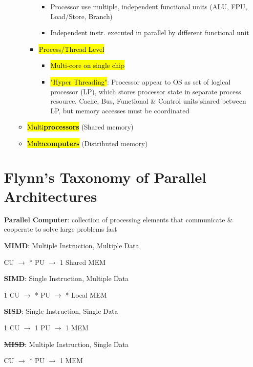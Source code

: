 \documentclass[12pt]{article}
\begin{document}
\begin{spacing}{1.5}
\begin{itemize}
\begin{itemize}
\begin{itemize}
\begin{itemize}
							\item Processor use multiple, independent functional units (ALU, FPU, Load/Store, Branch)
							\item Independent instr. executed in parallel by different functional unit
						\end{itemize}
					\item \hl{Process/Thread Level}
						\begin{itemize}
							\item \hl{Multi-core on single chip}
							\item \hl{"Hyper Threading"}: Processor appear to OS as set of logical processor (LP), which stores processor state in separate process resource. Cache, Bus, Functional \& Control units shared between LP, but memory accesses must be coordinated
						\end{itemize}
				\end{itemize}
			\item \hl{Multi\textbf{processors}} (Shared memory)
			\item \hl{Multi\textbf{computers}} (Distributed memory)
		\end{itemize}
\end{itemize}

\section{Flynn's Taxonomy of Parallel Architectures}

\begin{itemize*}
	\item \textbf{Parallel Computer}: collection of processing elements that communicate \& cooperate to solve large problems fast
	\item \textbf{MIMD}: Multiple Instruction, Multiple Data
		\begin{itemize*}
			\item * CU $\rightarrow$ * PU $\rightarrow$ 1 Shared MEM
		\end{itemize*}
	\item \textbf{SIMD}: Single Instruction, Multiple Data
		\begin{itemize*}
			\item 1 CU $\rightarrow$ * PU $\rightarrow$ * Local MEM
		\end{itemize*}
	\item \st{\textbf{SISD}}: Single Instruction, Single Data 
		\begin{itemize*}
			\item 1 CU $\rightarrow$ 1 PU $\rightarrow$ 1 MEM
		\end{itemize*}
	\item \st{\textbf{MISD}}: Multiple Instruction, Single Data
		\begin{itemize*}
			\item * CU $\rightarrow$ * PU $\rightarrow$ 1 MEM
		\end{itemize*}
\end{itemize*}


\end{spacing}
\end{document}
